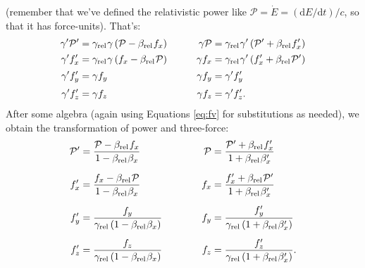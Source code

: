 \documentclass[12pt]{article}
\newcommand{\dd}[1]{\mathrm{d}#1}
\begin{document}
(remember that we've defined the relativistic power like $\mathcal{P} = \dot{E} = (\dd E / \dd t)/c$, so that it has force-units). That's:
\begin{equation*}
\begin{aligned}
\gamma^\prime \mathcal{P}^\prime &= \gamma_{\textrm{rel}} \mkern1mu \gamma \left( \mathcal{P} - \beta_{\textrm{rel}} \mkern1mu f_x \right) \qquad & \gamma \mathcal{P} &= \gamma_{\textrm{rel}} \mkern1mu \gamma^\prime \left( \mathcal{P}^\prime + \beta_{\textrm{rel}} \mkern1mu f^\prime_x \right) \\[1pt]
\gamma^\prime f_x^\prime &= \gamma_{\textrm{rel}} \mkern1mu \gamma \left( f_x - \beta_{\textrm{rel}} \mkern1mu \mathcal{P} \right)  & \gamma f_x &= \gamma_{\textrm{rel}} \mkern1mu \gamma^\prime \left( f^\prime_x + \beta_{\textrm{rel}} \mkern1mu \mathcal{P}^\prime \right) \\[2pt]
\gamma^\prime f_y^\prime &= \gamma f_y & \gamma f_y &= \gamma^\prime f_y^\prime \\[2pt]
\gamma^\prime f_z^\prime &= \gamma f_z & \gamma f_z &= \gamma^\prime f_z^\prime.
\end{aligned}
\end{equation*}
After some algebra (again using Equations \ref{eq:fv} for substitutions as needed), we obtain the transformation of power and three-force:
\begin{equation}\label{eq:ft}
\begin{aligned}
\mathcal{P}^\prime &= \dfrac{\mathcal{P} - \beta_{\textrm{rel}} \mkern1mu f_x}{1 - \beta_{\textrm{rel}} \mkern1mu \beta_x} & \mathcal{P} &= \dfrac{\mathcal{P}^\prime + \beta_{\textrm{rel}} \mkern1mu f_x^\prime}{1 + \beta_{\textrm{rel}} \mkern1mu \beta_x^\prime} \\[6pt]
f_x^\prime &= \dfrac{f_x - \beta_{\textrm{rel}} \mkern1mu \mathcal{P} }{1 - \beta_{\textrm{rel}} \mkern1mu \beta_x} & f_x &= \dfrac{ f^\prime_x + \beta_{\textrm{rel}} \mkern1mu \mathcal{P}^\prime }{1 + \beta_{\textrm{rel}} \mkern1mu \beta^\prime_x} \\[5pt]
f_y^\prime &= \dfrac{f_y}{\gamma_{\textrm{rel}} \left( 1 - \beta_{\textrm{rel}} \mkern1mu \beta_x \right) } \qquad \quad & f_y &= \dfrac{f^\prime_y}{\gamma_{\textrm{rel}} \left( 1 + \beta_{\textrm{rel}} \mkern1mu \beta^\prime_x \right) } \\[5pt]
f_z^\prime &= \dfrac{f_z}{\gamma_{\textrm{rel}} \left( 1 - \beta_{\textrm{rel}} \mkern1mu \beta_x \right) } & f_z &= \dfrac{f^\prime_z}{\gamma_{\textrm{rel}} \left( 1 + \beta_{\textrm{rel}} \mkern1mu \beta^\prime_x \right) } .
\end{aligned}
\end{equation}
\end{document}
